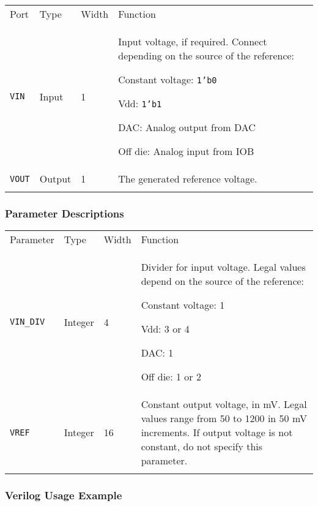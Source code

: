 \documentclass[11pt]{article}
\newcommand{\tokenstyle}[1]{\texttt{#1}}
\newcommand{\datastyle}[1]{\texttt{#1}}
\newcommand{\whenstyle}[1]{{\fontseries{sb}\selectfont#1}}
\newcommand{\thinhline}{\Xhline{1\arrayrulewidth}}
\newcommand{\thickhline}{\Xhline{2.5\arrayrulewidth}}
\newcommand{\novspace}{\vspace*{-\baselineskip}}
\begin{document}
\begin{tabularx}{\textwidth}{lllX}
\thinhline
\whenstyle{Port} & \whenstyle{Type} & \whenstyle{Width} & \whenstyle{Function} \\
\thickhline
\tokenstyle{VIN} & Input & 1 & Input voltage, if required. Connect depending on the source of the reference:
	\begin{compactitem}
		\item Constant voltage: \datastyle{1'b0}
		\item Vdd: \datastyle{1'b1}
		\item DAC: Analog output from DAC
		\item Off die: Analog input from IOB\novspace
	\end{compactitem}
\\
\thinhline
\tokenstyle{VOUT} & Output & 1 & The generated reference voltage. \\
\thinhline
\end{tabularx}

\subsubsection{Parameter Descriptions}

\begin{tabularx}{\textwidth}{lllX}
\thinhline
\whenstyle{Parameter} & \whenstyle{Type} & \whenstyle{Width} & \whenstyle{Function} \\
\thickhline
\tokenstyle{VIN\_DIV} & Integer & 4 &
	Divider for input voltage. Legal values depend on the source of the reference:
	\begin{compactitem}
		\item Constant voltage: 1
		\item Vdd: 3 or 4
		\item DAC: 1
		\item Off die: 1 or 2\novspace
	\end{compactitem}
\\
\thinhline
\tokenstyle{VREF} & Integer & 16 &
	Constant output voltage, in mV. Legal values range from 50 to 1200 in 50 mV increments.
	If output voltage is not constant, do not specify this parameter.\\
\thinhline
\end{tabularx}

\subsubsection{Verilog Usage Example}
\end{document}
